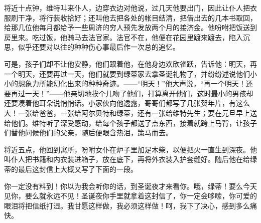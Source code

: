 \documentclass[12pt,oneside]{book}
\begin{document}
\begin{framed}
将近十点钟，维特叫来仆人，边穿衣边对他说，过几天他要出门，因此让仆人把衣服刷干净，将行装收拾好；还叫他去把各处的帐目结清，把借出去的几本书取回，给那几位他每月都给予一些周济的穷人预先发放两个月的接济金。他吩咐把饭送到房里来。吃过饭，他骑马去法官家。法官不在，他便在花园里踱来踱去，陷入沉思，似乎还要对以往的种种伤心事最后作一次总的追忆。

可是，孩子们却不让他安静，他们跟着他，在他身边欢欣雀跃，告诉他：明天，再一个明天，还要再过一天，他们就要到绿蒂家去拿圣诞礼物了，并纷纷述说他们小小的想象力所能幻化出来的种种奇迹。——“明天！”他大声说，“再一个明天！还要再过一天！”——他亲切地挨个儿吻了他们，打算离开他们，这时最小的男孩却还要凑着他耳朵说悄悄话。小家伙向他透露，哥哥们都写了几张贺年片，有这么大！一张给爸爸，一张给阿尔贝特和绿蒂，还有一张给维特先生；要在元旦早上送给他们。维特听了深受感动，给每个孩子都送了点东西，接着就跨上马背，让孩子们替他问候他们的父亲，随后便眼含热泪，策马而去。

将近五点，他回到寓所，吩咐女仆在炉子里加足木柴，以便把火一直生到深夜。他叫仆人把书籍和内衣装进箱子，放在底下，再将外衣装入护套缝好。随后他在给绿蒂的最后这封信上大概又写了下面的一段。
\end{framed}

你一定没有料到！你以为我会听你的话，到圣诞夜才来看你。哦，绿蒂！要么今天见你，要么就永远不见！圣诞夜你手里就拿着这封信了，你一定会哆嗦，你可爱的眼泪将把信纸打湿。我甘愿这样做，我必须这样做！呵，我下了决心，感到多么痛快。
\end{document}
